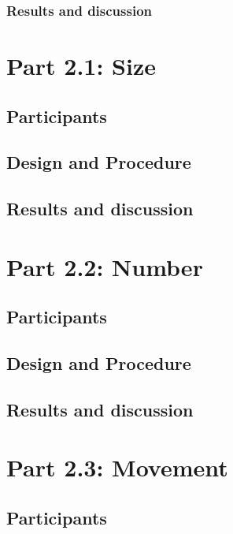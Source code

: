 \documentclass[man]{apa6}
\theoremstyle{definition}
\theoremstyle{definition}
\theoremstyle{definition}
\theoremstyle{remark}
\begin{document}
\subsubsection{Results and discussion}\label{results-and-discussion-6}

\section{Part 2.1: Size}\label{part-2.1-size}

\subsection{Participants}\label{participants-7}

\subsection{Design and Procedure}\label{design-and-procedure-7}

\subsection{Results and discussion}\label{results-and-discussion-7}

\section{Part 2.2: Number}\label{part-2.2-number}

\subsection{Participants}\label{participants-8}

\subsection{Design and Procedure}\label{design-and-procedure-8}

\subsection{Results and discussion}\label{results-and-discussion-8}

\section{Part 2.3: Movement}\label{part-2.3-movement}

\subsection{Participants}\label{participants-9}
\end{document}

